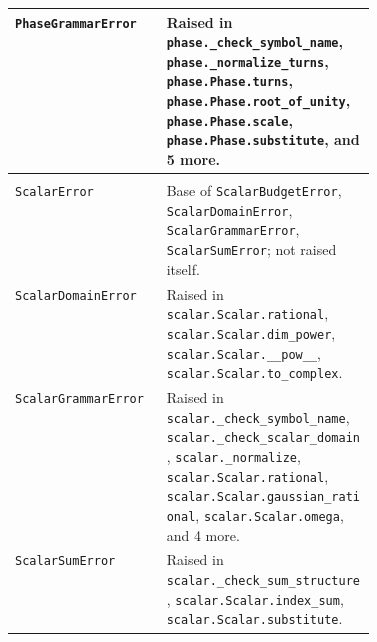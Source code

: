 {\begin{xltabular}{\linewidth}{@{}>{\raggedright\arraybackslash}p{0.42\linewidth}X@{}}
\texttt{PhaseGrammarError}\newline{} & Raised in \texttt{phase.\allowbreak{}\_\allowbreak{}check\_\allowbreak{}symbol\_\allowbreak{}name}, \texttt{phase.\allowbreak{}\_\allowbreak{}normalize\_\allowbreak{}turns}, \texttt{phase.\allowbreak{}Phase.\allowbreak{}turns}, \texttt{phase.\allowbreak{}Phase.\allowbreak{}root\_\allowbreak{}of\_\allowbreak{}unity}, \texttt{phase.\allowbreak{}Phase.\allowbreak{}scale}, \texttt{phase.\allowbreak{}Phase.\allowbreak{}substitute}, and 5 more. \\
\midrule
{}\\*
\texttt{ScalarError}\newline{} & Base of \texttt{ScalarBudgetError}, \texttt{ScalarDomainError}, \texttt{ScalarGrammarError}, \texttt{ScalarSumError}; not raised itself. \\
\texttt{ScalarDomainError}\newline{} & Raised in \texttt{scalar.\allowbreak{}Scalar.\allowbreak{}rational}, \texttt{scalar.\allowbreak{}Scalar.\allowbreak{}dim\_\allowbreak{}power}, \texttt{scalar.\allowbreak{}Scalar.\allowbreak{}\_\allowbreak{}\_\allowbreak{}pow\_\allowbreak{}\_\allowbreak{}}, \texttt{scalar.\allowbreak{}Scalar.\allowbreak{}to\_\allowbreak{}complex}. \\
\texttt{ScalarGrammarError}\newline{} & Raised in \texttt{scalar.\allowbreak{}\_\allowbreak{}check\_\allowbreak{}symbol\_\allowbreak{}name}, \texttt{scalar.\allowbreak{}\_\allowbreak{}check\_\allowbreak{}scalar\_\allowbreak{}domain}, \texttt{scalar.\allowbreak{}\_\allowbreak{}normalize}, \texttt{scalar.\allowbreak{}Scalar.\allowbreak{}rational}, \texttt{scalar.\allowbreak{}Scalar.\allowbreak{}gaussian\_\allowbreak{}rational}, \texttt{scalar.\allowbreak{}Scalar.\allowbreak{}omega}, and 4 more. \\
\texttt{ScalarSumError}\newline{} & Raised in \texttt{scalar.\allowbreak{}\_\allowbreak{}check\_\allowbreak{}sum\_\allowbreak{}structure}, \texttt{scalar.\allowbreak{}Scalar.\allowbreak{}index\_\allowbreak{}sum}, \texttt{scalar.\allowbreak{}Scalar.\allowbreak{}substitute}. \\

\end{xltabular}}
